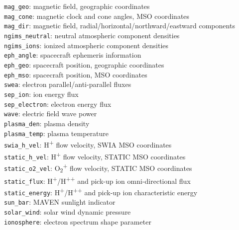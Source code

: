 \documentclass{article}
\begin{document}
\indent \indent \texttt{mag\_geo}: magnetic field, geographic coordinates\\
\indent \indent \texttt{mag\_cone}: magnetic clock and cone angles, MSO coordinates\\
\indent \indent \texttt{mag\_dir}: magnetic field, radial/horizontal/northward/eastward components\\
\indent \indent \texttt{ngims\_neutral}: neutral atmospheric component densities\\
\indent \indent \texttt{ngims\_ions}: ionized atmospheric component densities\\
\indent \indent \texttt{eph\_angle}: spacecraft ephemeris information\\
\indent \indent \texttt{eph\_geo}: spacecraft position, geographic coordinates\\
\indent \indent \texttt{eph\_mso}: spacecraft position, MSO coordinates\\
\indent \indent \texttt{swea}: electron parallel/anti-parallel fluxes\\
\indent \indent \texttt{sep\_ion}: ion energy flux\\
\indent \indent \texttt{sep\_electron}: electron energy flux\\
\indent \indent \texttt{wave}: electric field wave power\\
\indent \indent \texttt{plasma\_den}: plasma density\\
\indent \indent \texttt{plasma\_temp}: plasma temperature\\
\indent \indent \texttt{swia\_h\_vel}: H\textsuperscript{+} flow velocity, SWIA MSO coordinates\\
\indent \indent \texttt{static\_h\_vel}: H\textsuperscript{+} flow velocity, STATIC MSO coordinates\\
\indent \indent \texttt{static\_o2\_vel}: O\textsubscript{2}\textsuperscript{+} flow velocity, STATIC MSO coordinates\\
\indent \indent \texttt{static\_flux}: H\textsuperscript{+}/H\textsuperscript{++} and pick-up ion omni-directional flux\\
\indent \indent \texttt{static\_energy}: H\textsuperscript{+}/H\textsuperscript{++} and pick-up ion characteristic energy\\
\indent \indent \texttt{sun\_bar}: MAVEN sunlight indicator\\
\indent \indent \texttt{solar\_wind}: solar wind dynamic pressure\\
\indent \indent \texttt{ionosphere}: electron spectrum shape parameter\\
\end{document}

